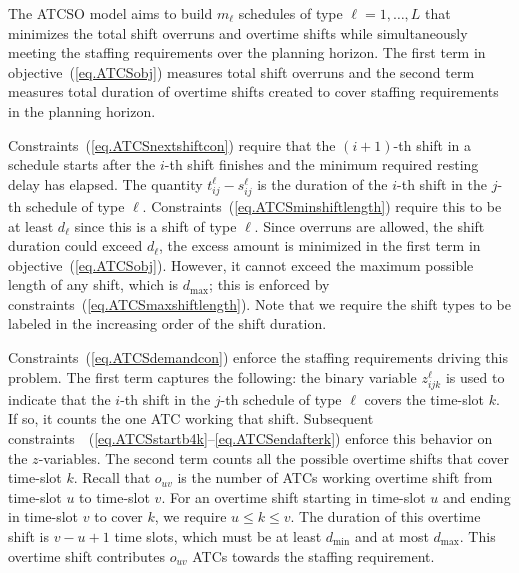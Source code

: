 \documentclass[11pt]{article}
\begin{document}
The ATCSO model aims to build $m_\ell$ schedules of type $\ell = 1,\ldots,L$ that minimizes the total shift overruns and overtime shifts while simultaneously meeting the staffing requirements over the planning horizon. The first term in objective~(\ref{eq.ATCSobj}) measures total shift overruns and the second term measures total duration of overtime shifts created to cover staffing requirements in the planning horizon. 

Constraints~(\ref{eq.ATCSnextshiftcon}) require that the $(i+1)$-th shift in a schedule starts after the $i$-th shift finishes and the minimum required resting delay has elapsed. The quantity $t_{ij}^\ell - s_{ij}^\ell$ is the duration of the $i$-th shift in the $j$-th schedule of type $\ell$. Constraints~(\ref{eq.ATCSminshiftlength}) require this to be at least $d_\ell$ since this is a shift of type $\ell$. Since overruns are allowed, the shift duration could exceed $d_\ell$, the excess amount is minimized in the first term in objective~(\ref{eq.ATCSobj}). However, it cannot exceed the maximum possible length of any shift, which is $d_{\max}$; this is enforced by constraints~(\ref{eq.ATCSmaxshiftlength}). Note that we require the shift types to be labeled in the increasing order of the shift duration. 

Constraints~(\ref{eq.ATCSdemandcon}) enforce the staffing requirements driving this problem. 
 The first term captures the following: the binary variable $z_{ijk}^\ell$ is used to indicate that the $i$-th shift in the $j$-th schedule of type $\ell$ covers the time-slot $k$. If so, it counts the one ATC working that shift. Subsequent constraints~~(\ref{eq.ATCSstartb4k}--\ref{eq.ATCSendafterk}) enforce this behavior on the $z$-variables. The second term   counts all the possible overtime shifts that cover time-slot $k$. Recall that $o_{uv}$ is the number of ATCs working overtime shift from time-slot $u$ to time-slot $v$. For an overtime shift starting in time-slot $u$ and ending in time-slot $v$ to cover $k$, we require $u \le k \le v$. The duration of this overtime shift is $v-u+1$ time slots, which must be at least $d_{\min}$ and at most $d_{\max}$. This overtime shift contributes $o_{uv}$ ATCs towards the staffing requirement. 
\end{document}
